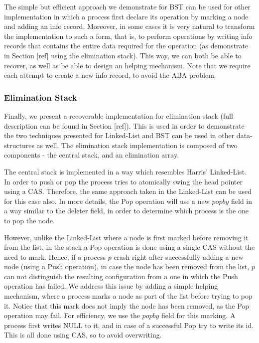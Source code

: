 The simple but efficient approach we demonstrate for BST can be used for other implementation in which a process first declare its operation by marking a node and adding an info record. Moreover, in some cases it is very natural to transform the implementation to such a form, that is, to perform operations by writing info records that contains the entire data required for the operation (as demonstrate in Section [ref] using the elimination stack). This way, we can both be able to recover, as well as be able to design an helping mechanism. Note that we require each attempt to create a new info record, to avoid the ABA problem.


\subsubsection*{Elimination Stack}
Finally, we present a recoverable implementation for elimination stack (full description can be found in Section [ref]). This is used in order to demonstrate the two techniques presented for Linked-List and BST can be used in other data-structures as well. The elimination stack implementation is composed of two components - the central stack, and an elimination array.

The central stack is implemented in a way which resembles Harris' Linked-List. In order to push or pop the process tries to atomically swing the head pointer using a CAS. Therefore, the same approach taken in the Linked-List can be used for this case also. In more details, the Pop operation will use a new $popby$ field in a way similar to the deleter field, in order to determine which process is the one to pop the node.

However, unlike the Linked-List where a node is first marked before removing it from the list, in the stack a Pop operation is done using a single CAS without the need to mark. Hence, if a process $p$ crash right after successfully adding a new node (using a Push operation), in case the node has been removed from the list, $p$ can not distinguish the resulting configuration from a one in which the Push operation has failed. We address this issue by adding a simple helping mechanism, where a process marks a node as part of the list before trying to pop it. Notice that this mark does not imply the node has been removed, as the Pop operation may fail. For efficiency, we use the $popby$ field for this marking. A process first writes NULL to it, and in case of a successful Pop try to write its id. This is all done using CAS, so to avoid overwriting.

